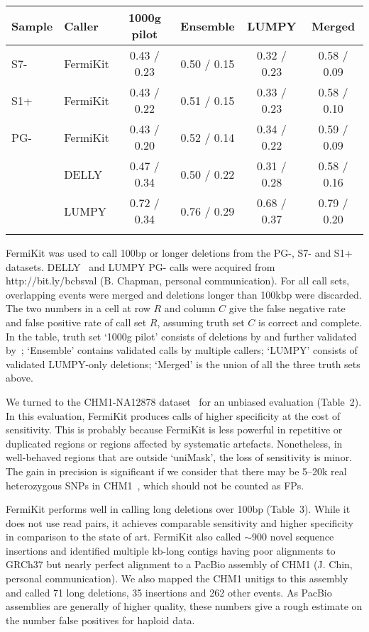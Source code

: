 \documentclass{bioinfo}
\begin{document}
\begin{table}[t]
{\footnotesize
\begin{tabular}{llcccc}
\toprule
Sample& Caller  & {1000g pilot} & {Ensemble} & {LUMPY} & {Merged}\\
\midrule
S7- & FermiKit  & 0.43 / 0.23 & 0.50 / 0.15 & 0.32 / 0.23 & 0.58 / 0.09 \\
S1+ & FermiKit  & 0.43 / 0.22 & 0.51 / 0.15 & 0.33 / 0.23 & 0.58 / 0.10 \\
PG- & FermiKit  & 0.43 / 0.20 & 0.52 / 0.14 & 0.34 / 0.22 & 0.59 / 0.09\\
    & DELLY     & 0.47 / 0.34 & 0.50 / 0.22 & 0.31 / 0.28 & 0.58 / 0.16\\
    & LUMPY     & 0.72 / 0.34 & 0.76 / 0.29 & 0.68 / 0.37 & 0.79 / 0.20\\
\botrule
\end{tabular}}{FermiKit was used to call 100bp or longer deletions from the
PG-, S7- and S1+ datasets. DELLY~\citep{Rausch:2012aa} and LUMPY PG- calls were
acquired from http://bit.ly/bcbsval (B. Chapman, personal communication). For
all call sets, overlapping events were merged and deletions longer than 100kbp
were discarded.  The two numbers in a cell at row $R$ and column $C$ give the
false negative rate and false positive rate of call set $R$, assuming truth set
$C$ is correct and complete.  In the table, truth set `1000g pilot' consists of
deletions by \citet{Mills:2011aa} and further validated
by~\citet{Layer:2014aa}; `Ensemble' contains validated calls by multiple
callers; `LUMPY' consists of validated LUMPY-only deletions; `Merged' is the
union of all the three truth sets above.}
\end{table}

We turned to the CHM1-NA12878 dataset~\citep{Li:2014aa} for an unbiased
evaluation (Table~2). In this evaluation, FermiKit produces calls of higher
specificity at the cost of sensitivity. This is probably because FermiKit is
less powerful in repetitive or duplicated regions or regions affected by
systematic artefacts. Nonetheless, in well-behaved regions that are outside
`uniMask', the loss of sensitivity is minor. The gain in precision is
significant if we consider that there may be 5--20k real heterozygous SNPs in
CHM1~\citep{Li:2014aa}, which should not be counted as FPs.

FermiKit performs well in calling long deletions over 100bp (Table~3). While
it does not use read pairs, it achieves comparable sensitivity and higher
specificity in comparison to the state of art. FermiKit also called $\sim$900
novel sequence insertions and identified multiple kb-long contigs having 
poor alignments to GRCh37 but nearly perfect alignment to a PacBio assembly of
CHM1 (J. Chin, personal communication). We also mapped the CHM1 unitigs to
this assembly and called 71 long deletions, 35 insertions and 262 other events.
As PacBio assemblies are generally of higher quality, these numbers give a
rough estimate on the number false positives for haploid data.
\end{document}
